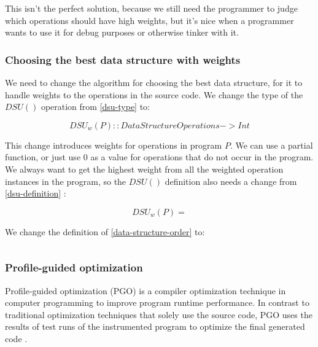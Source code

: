 \documentclass[11pt]{article}
\begin{document}
			

			This isn't the perfect solution, because we still need the programmer to judge which operations
			should have high weights, but it's nice when a programmer wants to use it for debug purposes or
			otherwise tinker with it.

		\subsubsection{Choosing the best data structure with weights}

			We need to change the algorithm for choosing the best data structure, for it to handle weights
			to the operations in the source code. We change the type of the $DSU()$ operation from
			\ref{dsu-type} to:

			\begin{equation}
				DSU_w(P) :: DataStructureOperations -> Int
			\end{equation}

			This change introduces weights for operations in program $P$. We can use a partial function, or
			just use $0$ as a value for operations that do not occur in the program. We always want to get
			the highest weight from all the weighted operation instances in the program, so the $DSU()$
			definition also needs a change from \ref{dsu-definition} :

			\begin{equation}
				DSU_w(P) =
			\end{equation}

			We change the definition of \autoref{data-structure-order} to:

			\begin{equation}
			\end{equation}

		\subsubsection{Profile-guided optimization}

			Profile-guided optimization (PGO) is a compiler optimization technique in computer programming
			to improve program runtime performance.  In contrast to traditional optimization techniques that
			solely use the source code, PGO uses the results of test runs of the instrumented program to
			optimize the final generated code .
\end{document}

